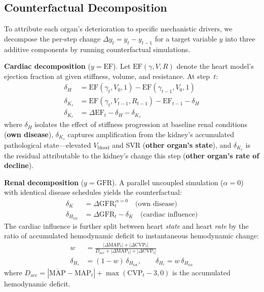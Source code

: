 \documentclass[pmlr]{jmlr}
\begin{document}
\subsection{Counterfactual Decomposition}
\label{sec:decomposition}

To attribute each organ's deterioration to specific mechanistic drivers, we decompose the per-step change $\Delta y_t = y_t - y_{t-1}$ for a target variable $y$ into three additive components by running counterfactual simulations.

\textbf{Cardiac decomposition} ($y = \text{EF}$). Let $\text{EF}(\gamma, V, R)$ denote the heart model's ejection fraction at given stiffness, volume, and resistance. At step~$t$:
\begin{align}
\delta_H &= \text{EF}(\gamma_t, V_0, 1) - \text{EF}(\gamma_{t-1}, V_0, 1) \label{eq:dh}\\
\delta_{K_s} &= \text{EF}(\gamma_t, V_{t-1}, R_{t-1}) - \text{EF}_{t-1} - \delta_H \label{eq:dks}\\
\delta_{K_r} &= \Delta\text{EF}_t - \delta_H - \delta_{K_s} \label{eq:dkr}
\end{align}
where $\delta_H$ isolates the effect of stiffness progression at baseline renal conditions (\textbf{own disease}), $\delta_{K_s}$ captures amplification from the kidney's accumulated pathological state---elevated $V_{\text{blood}}$ and SVR (\textbf{other organ's state}), and $\delta_{K_r}$ is the residual attributable to the kidney's change this step (\textbf{other organ's rate of decline}).

\textbf{Renal decomposition} ($y = \text{GFR}$). A parallel uncoupled simulation ($\alpha = 0$) with identical disease schedules yields the counterfactual:
\begin{align}
\delta_K &= \Delta\text{GFR}_t^{\,\alpha=0} \quad \text{(own disease)} \label{eq:dk}\\
\delta_{H_{\text{tot}}} &= \Delta\text{GFR}_t - \delta_K \quad \text{(cardiac influence)} \label{eq:dhtot}
\end{align}
The cardiac influence is further split between heart \emph{state} and heart \emph{rate} by the ratio of accumulated hemodynamic deficit to instantaneous hemodynamic change:
\begin{align}
w &= \frac{|\Delta\text{MAP}_t| + |\Delta\text{CVP}_t|}{D_{\text{acc}} + |\Delta\text{MAP}_t| + |\Delta\text{CVP}_t|} \nonumber\\
\delta_{H_s} &= (1-w)\,\delta_{H_{\text{tot}}}, \qquad \delta_{H_r} = w\,\delta_{H_{\text{tot}}} \label{eq:dhsplit}
\end{align}
where $D_{\text{acc}} = |\overline{\text{MAP}} - \text{MAP}_t| + \max(\text{CVP}_t - 3, 0)$ is the accumulated hemodynamic deficit.
\end{document}

